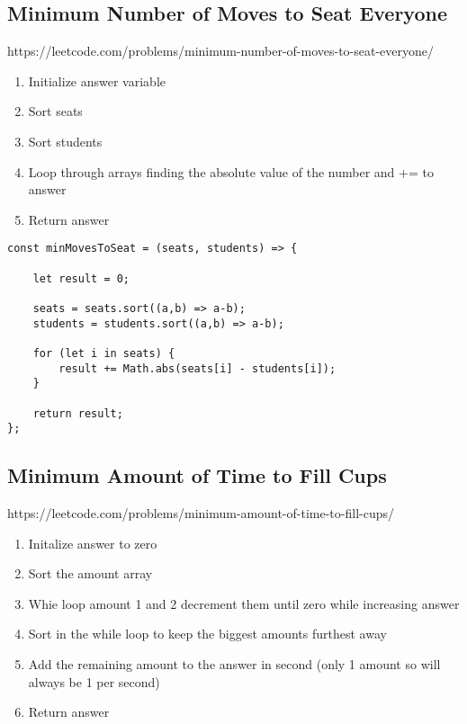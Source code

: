 \documentclass[10pt]{article}
\begin{document}
\pagebreak %
\medskip 
\subsection{Minimum Number of Moves to Seat Everyone}
https://leetcode.com/problems/minimum-number-of-moves-to-seat-everyone/

\begin{enumerate}
	\item Initialize answer variable
	\item Sort seats
	\item Sort students
	\item Loop through arrays finding the absolute value of the number and += to answer
	\item Return answer
\end{enumerate}



\begin{lstlisting}[title=Solution minMovesToSeat, captionpos=t]
const minMovesToSeat = (seats, students) => {
    
    let result = 0;
    
    seats = seats.sort((a,b) => a-b);
    students = students.sort((a,b) => a-b);
    
    for (let i in seats) {
        result += Math.abs(seats[i] - students[i]);
    }
    
    return result;
};
\end{lstlisting}
\medskip %






\pagebreak %
\medskip 
\subsection{Minimum Amount of Time to Fill Cups}
https://leetcode.com/problems/minimum-amount-of-time-to-fill-cups/

\begin{enumerate}
	\item Initalize answer to zero
	\item Sort the amount array 
	\item Whie loop amount 1 and 2 decrement them until zero while increasing answer
	\item Sort in the while loop to keep the biggest amounts furthest away 
	\item Add the remaining amount to the answer in second (only 1 amount so will always be 1 per second)
	\item Return answer
\end{enumerate}
\end{document}
